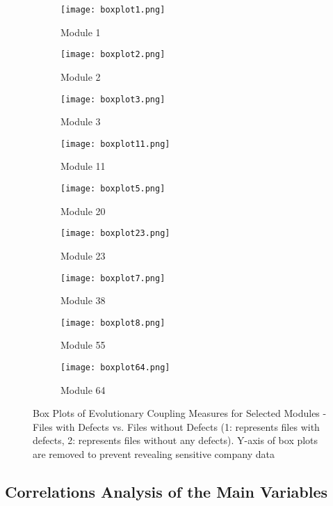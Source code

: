 \documentclass[times]{smrauth}
\begin{document}
\begin{figure*}[h]
\centering
\begin{subfigure}{.33\textwidth}
  \centering
  \texttt{[image: boxplot1.png]}
  \caption{Module 1}
  \label{fig:sfig1}
\end{subfigure}%
\begin{subfigure}{.33\textwidth}
  \centering
  \texttt{[image: boxplot2.png]}
  \caption{Module 2}
  \label{fig:sfig2}
\end{subfigure}
\begin{subfigure}{.33\textwidth}
  \centering
  \texttt{[image: boxplot3.png]}
  \caption{Module 3}
  \label{fig:sfig3}
\end{subfigure}
\begin{subfigure}{.33\textwidth}
  \centering
  \texttt{[image: boxplot11.png]}
  \caption{Module 11}
  \label{fig:sfig4}
\end{subfigure}%
\begin{subfigure}{.33\textwidth}
  \centering
  \texttt{[image: boxplot5.png]}
  \caption{Module 20}
  \label{fig:sfig5}
\end{subfigure}
\begin{subfigure}{.33\textwidth}
  \centering
  \texttt{[image: boxplot23.png]}
  \caption{Module 23}
  \label{fig:sfig6}
\end{subfigure}
\begin{subfigure}{.33\textwidth}
  \centering
  \texttt{[image: boxplot7.png]}
    \caption{Module 38}
  \label{fig:sfig7}
\end{subfigure}%
\begin{subfigure}{.33\textwidth}
  \centering
  \texttt{[image: boxplot8.png]}
  \caption{Module 55}
  \label{fig:sfig8}
\end{subfigure}
\begin{subfigure}{.33\textwidth}
  \centering
  \texttt{[image: boxplot64.png]}
  \caption{Module 64}
  \label{fig:sfig9}
\end{subfigure}
\caption{Box Plots of Evolutionary Coupling Measures for Selected Modules - Files with Defects vs. Files without Defects (1: represents files with defects, 2: represents files without any defects). Y-axis of box plots are removed to prevent revealing sensitive company data}
\label{boxplots}
\end{figure*}

\newpage
\subsection{Correlations Analysis of the Main Variables}
\end{document}
